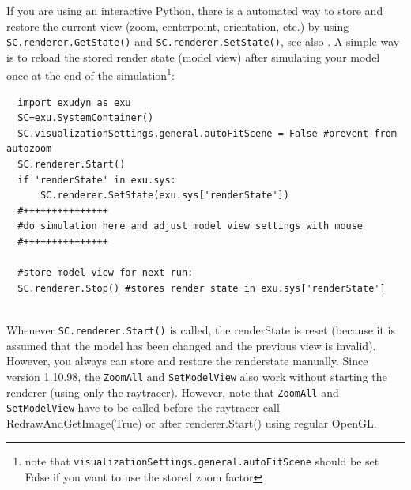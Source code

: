 If you are using an interactive Python, there is a automated way to store and restore the current view (zoom, centerpoint, orientation, etc.) by using \texttt{SC.renderer.GetState()} and \texttt{SC.renderer.SetState()},
see also .
%
A simple way is to reload the stored render state (model view) after simulating your model once at the end of the simulation\footnote{
note that \texttt{visualizationSettings.general.autoFitScene} should be set False if you want to use the stored zoom factor}:
\pythonstyle\begin{lstlisting}
  import exudyn as exu
  SC=exu.SystemContainer()
  SC.visualizationSettings.general.autoFitScene = False #prevent from autozoom
  SC.renderer.Start()
  if 'renderState' in exu.sys:
      SC.renderer.SetState(exu.sys['renderState']) 
  #+++++++++++++++
  #do simulation here and adjust model view settings with mouse
  #+++++++++++++++

  #store model view for next run:
  SC.renderer.Stop() #stores render state in exu.sys['renderState']
\end{lstlisting}
\horizontalRuler \\
%
Whenever \texttt{SC.renderer.Start()} is called, the renderState is reset (because it is assumed that the model has been changed and the previous view is invalid). However, you always can store and restore the renderstate manually.
Since version 1.10.98, the \texttt{ZoomAll} and \texttt{SetModelView} also work without starting the renderer (using only the raytracer). However, note that \texttt{ZoomAll} and \texttt{SetModelView} have to be called before the raytracer call RedrawAndGetImage(True) or after renderer.Start() using regular OpenGL.

